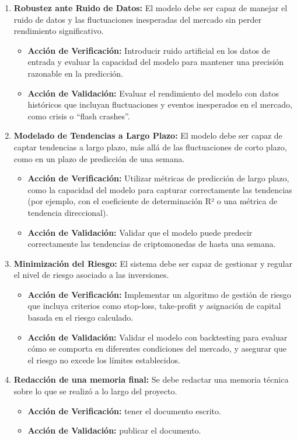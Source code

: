 \documentclass[
    11pt, %
]{charter}
\begin{document}
\begin{enumerate}
    \item \textbf{Robustez ante Ruido de Datos:} El modelo debe ser capaz de manejar el ruido de datos y las fluctuaciones inesperadas del mercado sin perder rendimiento significativo.
      \begin{itemize}
      \item \textbf{Acción de Verificación:} Introducir ruido artificial en los datos de entrada y evaluar la capacidad del modelo para mantener una precisión razonable en la predicción.
      \item \textbf{Acción de Validación:} Evaluar el rendimiento del modelo con datos históricos que incluyan fluctuaciones y eventos inesperados en el mercado, como crisis o “flash crashes”.
      \end{itemize}

    \item \textbf{Modelado de Tendencias a Largo Plazo:} El modelo debe ser capaz de captar tendencias a largo plazo, más allá de las fluctuaciones de corto plazo, como en un plazo de predicción de una semana.
      \begin{itemize}
      \item \textbf{Acción de Verificación:} Utilizar métricas de predicción de largo plazo, como la capacidad del modelo para capturar correctamente las tendencias (por ejemplo, con el coeficiente de determinación R² o una métrica de tendencia direccional).
      \item \textbf{Acción de Validación:} Validar que el modelo puede predecir correctamente las tendencias de criptomonedas de hasta una semana.
      \end{itemize}

    \item \textbf{Minimización del Riesgo:} El sistema debe ser capaz de gestionar y regular el nivel de riesgo asociado a las inversiones.
      \begin{itemize}
      \item \textbf{Acción de Verificación:} Implementar un algoritmo de gestión de riesgo que incluya criterios como stop-loss, take-profit y asignación de capital basada en el riesgo calculado.
      \item \textbf{Acción de Validación:} Validar el modelo con backtesting para evaluar cómo se comporta en diferentes condiciones del mercado, y asegurar que el riesgo no excede los límites establecidos.
      \end{itemize}

    \item \textbf{Redacción de una memoria final:} Se debe redactar una memoria técnica sobre lo que se realizó a lo largo del proyecto.
      \begin{itemize}
      \item \textbf{Acción de Verificación:} tener el documento escrito.
      \item \textbf{Acción de Validación:} publicar el documento.
      \end{itemize}


\end{enumerate}
\end{document}
